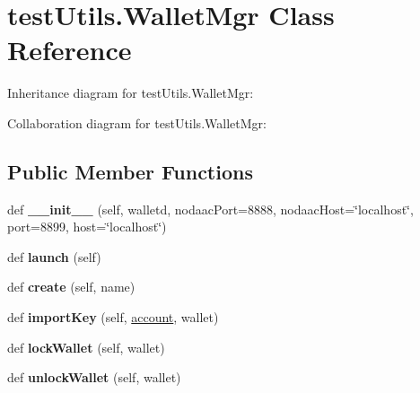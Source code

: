 \hypertarget{classtest_utils_1_1_wallet_mgr}{}\section{test\+Utils.\+Wallet\+Mgr Class Reference}
\label{classtest_utils_1_1_wallet_mgr}


Inheritance diagram for test\+Utils.\+Wallet\+Mgr\+:


Collaboration diagram for test\+Utils.\+Wallet\+Mgr\+:
\subsection*{Public Member Functions}
\begin{DoxyCompactItemize}
\item 
\mbox{\label{classtest_utils_1_1_wallet_mgr_a7273eef826e87ff454d45a2aa71cf375}} 
def {\bfseries \+\_\+\+\_\+init\+\_\+\+\_\+} (self, walletd, nodaac\+Port=8888, nodaac\+Host=\char`\"{}localhost\char`\"{}, port=8899, host=\char`\"{}localhost\char`\"{})
\item 
\mbox{\label{classtest_utils_1_1_wallet_mgr_a039a6c12ac05ca693436b23d739976f9}} 
def {\bfseries launch} (self)
\item 
\mbox{\label{classtest_utils_1_1_wallet_mgr_a84ec3ef6bac64d354c63c9f3801b4b8d}} 
def {\bfseries create} (self, name)
\item 
\mbox{\label{classtest_utils_1_1_wallet_mgr_acec3961114ed4d0e7b6eb56056baa1d0}} 
def {\bfseries import\+Key} (self, \mbox{\hyperlink{structaccount}{account}}, wallet)
\item 
\mbox{\label{classtest_utils_1_1_wallet_mgr_a3ff231da93b0e575bc061d222097f9ad}} 
def {\bfseries lock\+Wallet} (self, wallet)
\item 
\mbox{\label{classtest_utils_1_1_wallet_mgr_af584a7f08615bf305142f2c7c0f1d934}} 
def {\bfseries unlock\+Wallet} (self, wallet)
\item 
\mbox{\label{classtest_utils_1_1_wallet_mgr_acda506ec1ea3337c962add905997995c}} 

\end{DoxyCompactItemize}
